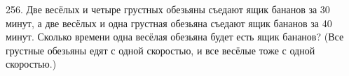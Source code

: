 256. Две весёлых и четыре грустных обезьяны съедают ящик бананов за 30 минут, а две весёлых и одна грустная обезьяна съедают ящик бананов за 40 минут. Сколько времени одна весёлая обезьяна будет есть ящик бананов? (Все грустные обезьяны едят с одной скоростью, и все весёлые тоже с одной скоростью.)\\
